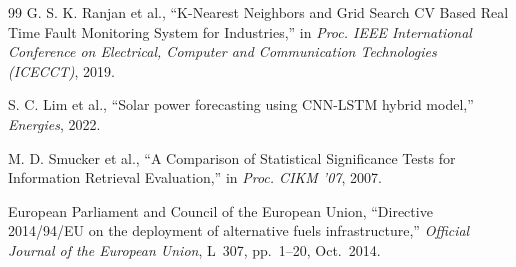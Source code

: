 \documentclass[conference]{IEEEtran}
\begin{document}
\begin{thebibliography}{99}
G. S. K. Ranjan et al., ``K-Nearest Neighbors and Grid Search CV Based Real Time Fault Monitoring System for Industries,'' in \textit{Proc. IEEE International Conference on Electrical, Computer and Communication Technologies (ICECCT)}, 2019.

S. C. Lim et al., ``Solar power forecasting using CNN-LSTM hybrid model,'' \textit{Energies}, 2022.

M. D. Smucker et al., ``A Comparison of Statistical Significance Tests for Information Retrieval Evaluation,'' in \textit{Proc. CIKM '07}, 2007.


European Parliament and Council of the European Union, ``Directive 2014/94/EU on the deployment of alternative fuels infrastructure,'' \textit{Official Journal of the European Union}, L~307, pp.~1--20, Oct.\ 2014.

\end{thebibliography}
\end{document}
